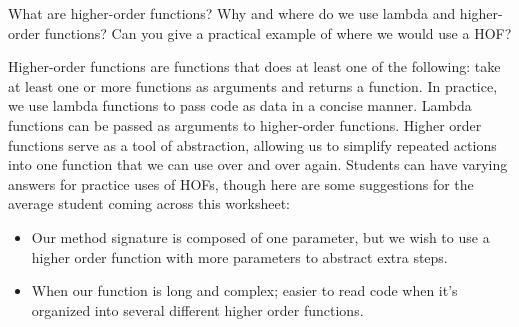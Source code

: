 \begin{blocksection}
\question What are higher-order functions? Why and where do we use lambda and higher-order functions? Can you give a practical example of where we would use a HOF?

\begin{solution}[0.5in]
Higher-order functions are functions that does at least one of the following: take at least one or more functions as arguments and returns a function. 
In practice, we use lambda functions to pass code as data in a concise manner. Lambda functions can be passed as arguments to higher-order functions.
Higher order functions serve as a tool of abstraction, allowing us to simplify repeated actions into one function that we can use over and over again. 
Students can have varying answers for practice uses of HOFs, though here are some suggestions for the average student coming across this worksheet:
\begin{itemize}
    \item Our method signature is composed of one parameter, but we wish to use a higher order function with more parameters to abstract extra steps.
    \item When our function is long and complex; easier to read code when it's organized into several different higher order functions.
\end{itemize}

\end{solution}
\end{blocksection}